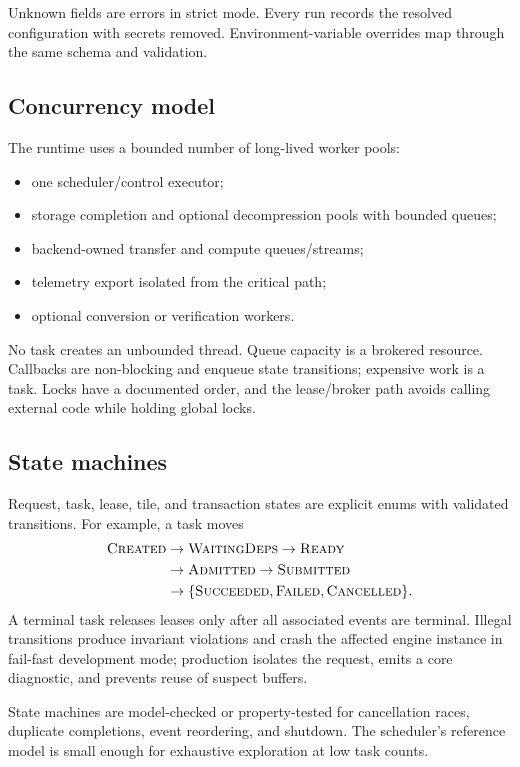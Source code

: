 Unknown fields are errors in strict mode. Every run records the resolved configuration with secrets removed. Environment-variable overrides map through the same schema and validation.

\subsection{Concurrency model}

The runtime uses a bounded number of long-lived worker pools:

\begin{itemize}
  \item one scheduler/control executor;
  \item storage completion and optional decompression pools with bounded queues;
  \item backend-owned transfer and compute queues/streams;
  \item telemetry export isolated from the critical path;
  \item optional conversion or verification workers.
\end{itemize}

No task creates an unbounded thread. Queue capacity is a brokered resource. Callbacks are non-blocking and enqueue state transitions; expensive work is a task. Locks have a documented order, and the lease/broker path avoids calling external code while holding global locks.

\subsection{State machines}

Request, task, lease, tile, and transaction states are explicit enums with validated transitions. For example, a task moves
\[
\begin{aligned}
\textsc{Created}&\to\textsc{WaitingDeps}\to\textsc{Ready}\\
&\to\textsc{Admitted}\to\textsc{Submitted}\\
&\to\{\textsc{Succeeded},\textsc{Failed},\textsc{Cancelled}\}.
\end{aligned}
\]
A terminal task releases leases only after all associated events are terminal. Illegal transitions produce invariant violations and crash the affected engine instance in fail-fast development mode; production isolates the request, emits a core diagnostic, and prevents reuse of suspect buffers.

State machines are model-checked or property-tested for cancellation races, duplicate completions, event reordering, and shutdown. The scheduler's reference model is small enough for exhaustive exploration at low task counts.

